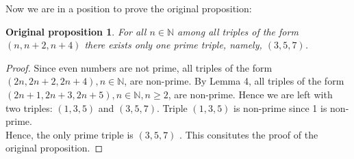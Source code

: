 \documentclass[11pt]{article}
\begin{document}
   Now we are in a position to prove the original proposition:
   \newtheorem*{Theorem}{Original proposition}
   \begin{Theorem}
      For all $n \in \mathbb{N}$ among  all triples of the form $(n, n + 2, n + 4)$ there exists only one prime triple, namely, $(3, 5, 7)$.
   \end{Theorem}
   \begin{proof}
      Since even numbers are not prime, all triples of the form $(2n, 2n + 2, 2n + 4), n \in \mathbb{N}$, are non-prime.
      By Lemma 4, all triples of the form $(2n + 1, 2n + 3, 2n + 5), n \in \mathbb{N}, n \geq 2$, are non-prime.
      Hence we are left with two triples: $(1, 3, 5)$ and $(3, 5, 7)$. Triple $(1, 3, 5)$ is non-prime since 1 is non-prime. \\
      Hence, the only prime triple is $(3, 5, 7)$ .
      This consitutes the proof of the original proposition.
   \end{proof}
\end{document}
